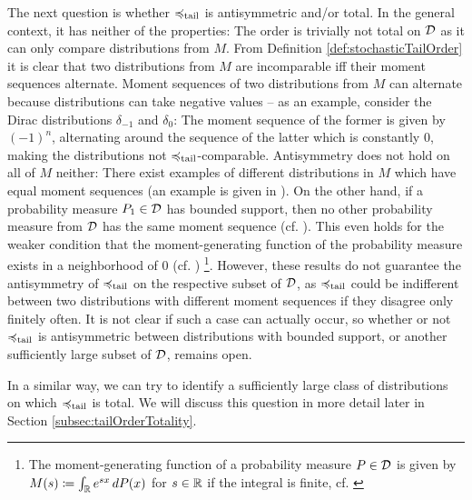 \documentclass[a4paper,DIV=11,abstracton,twoside=semi]{scrreprt}
\newcommand{\M}{M}
\theoremstyle{definition}
\begin{document}
    The next question is whether $\preccurlyeq_{\text{tail}}$ is antisymmetric and/or total.
    In the general context, it has neither of the properties: The order is trivially not total on $\mathcal{D}$ as it can only compare distributions from $M$.
    From Definition \ref{def:stochasticTailOrder} it is clear that two distributions from $M$ are incomparable iff their moment sequences alternate. Moment sequences of two distributions from $M$ can alternate because distributions can take negative values -- as an example, consider the Dirac distributions $\delta_{-1}$ and $\delta_{0}$: The moment sequence of the former is given by $(-1)^n$, alternating around the sequence of the latter which is constantly $0$, making the distributions not $\preccurlyeq_{\text{tail}}$-comparable.
    Antisymmetry does not hold on all of $M$ neither: There exist examples of different distributions in $\M$ which have equal moment sequences (an example is given in \cite[Example 3.15]{bib:romanoCounterexamplesInProbability}).
    On the other hand, if a probability measure $P_1 \in \mathcal{D}$ has bounded support, then no other probability measure from $\mathcal{D}$ has the same moment sequence (cf. \cite[Corollary 4.2]{bib:schmuedgenTheMomentProblem}).
    This even holds for the weaker condition that the moment-generating function of the probability measure exists in a neighborhood of 0 (cf. \cites[Lemma 2.3]{bib:rassGameRiskManagI}[p.414]{bib:billingsleyProbabilityAndMeasure})
     \footnote{The moment-generating function of a probability measure $P \in \mathcal{D}$ is given by $M(s) \coloneqq \int_{\mathbb{R}} e^{sx} \, dP(x)$ for $s \in \mathbb{R}$ if the integral is finite, cf. \cite[(21.21)]{bib:billingsleyProbabilityAndMeasure}}.
    However, these results do not guarantee the antisymmetry of $\preccurlyeq_{\text{tail}}$ on the respective subset of $\mathcal{D}$, as $\preccurlyeq_{\text{tail}}$ could be indifferent between two distributions with different moment sequences if they disagree only finitely often. It is not clear if such a case can actually occur, so whether or not $\preccurlyeq_{\text{tail}}$ is antisymmetric between distributions with bounded support, or another sufficiently large subset of $\mathcal{D}$, remains open.
    
    In a similar way, we can try to identify a sufficiently large class of distributions on which $\preccurlyeq_{\text{tail}}$ is total. We will discuss this question in more detail later in Section \ref{subsec:tailOrderTotality}.
    
\end{document}
